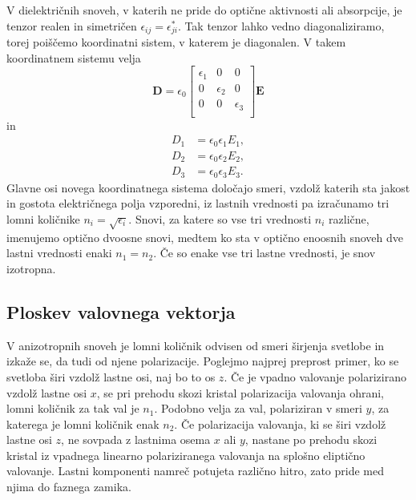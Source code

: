 V dielektričnih snoveh, v katerih ne pride do optične aktivnosti ali absorpcije, je tenzor
realen in simetričen $\epsilon_{ij}=\epsilon_{ji}^*$. Tak tenzor lahko vedno
diagonaliziramo, torej poiščemo koordinatni sistem, v katerem je 
diagonalen. V takem koordinatnem sistemu velja 
\begin{equation}
\mathbf{D} = \epsilon_{0}
\left[\begin{array}{ccc}
\epsilon_{1} & 0& 0\\
0 & \epsilon_{2}& 0\\
0 & 0& \epsilon_{3}\\
\end{array}\right]\mathbf{E}
\end{equation}
in 
\begin{align}
D_{1}&=\epsilon_{0}\epsilon_{1}E_{1},\nonumber \\
D_{2}&=\epsilon_{0}\epsilon_{2}E_{2},\nonumber \\
D_{3}&=\epsilon_{0}\epsilon_{3}E_{3}.\label{eq:gostota-elektricnega-polja-lastni}
\end{align}
Glavne osi novega koordinatnega sistema določajo smeri, vzdolž katerih sta jakost
in gostota električnega polja vzporedni, iz lastnih vrednosti 
pa izračunamo tri lomni količnike $n_{i}=\sqrt{\epsilon_{i}}$. Snovi,
za katere so vse tri vrednosti $n_i$ različne, imenujemo optično dvoosne snovi, 
medtem ko sta v optično enoosnih snoveh dve lastni vrednosti enaki $n_{1}=n_{2}$. 
Če so enake vse tri lastne vrednosti, je snov izotropna.

\subsection*{Ploskev valovnega vektorja}
V anizotropnih snoveh je lomni količnik odvisen od smeri 
širjenja svetlobe in izkaže se, da tudi od njene polarizacije. Poglejmo 
najprej preprost primer, ko se svetloba širi vzdolž lastne osi, naj bo to os $z$.
Če je vpadno valovanje polarizirano vzdolž lastne osi $x$, se pri prehodu
skozi kristal polarizacija valovanja ohrani, lomni količnik za
tak val je $n_{1}$. Podobno velja za val, polariziran v smeri
$y$, za katerega je lomni količnik enak $n_{2}$. Če polarizacija valovanja, 
ki se širi vzdolž lastne osi $z$, ne sovpada z lastnima osema $x$ ali $y$, nastane po 
prehodu skozi kristal iz vpadnega linearno polariziranega valovanja na splošno eliptično valovanje. Lastni komponenti namreč potujeta različno
hitro, zato pride med njima do faznega zamika. 

